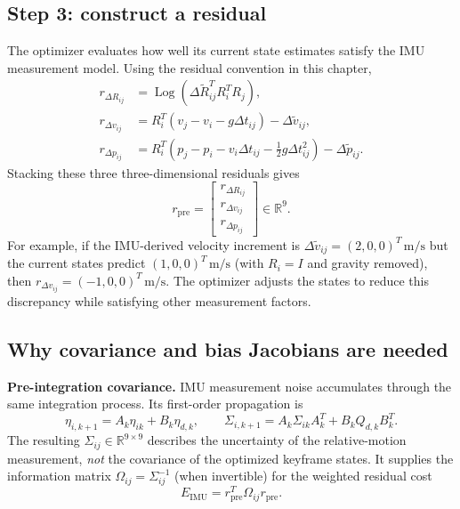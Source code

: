 \documentclass[11pt,a4paper]{article}
\newcommand{\Log}{\operatorname{Log}}
\newcommand{\R}{\mathbb{R}}
\begin{document}
\subsection{Step 3: construct a residual}
The optimizer evaluates how well its current state estimates satisfy
the IMU measurement model. Using the residual convention in this chapter,
\begin{subequations}\label{eq:concept_residuals}
\begin{align}
r_{\Delta R_{ij}}
&=\Log\!\left(\Delta\tilde R_{ij}^TR_i^TR_j\right),\\
r_{\Delta v_{ij}}
&=R_i^T(v_j-v_i-g\Delta t_{ij})-\Delta\tilde v_{ij},\\
r_{\Delta p_{ij}}
&=R_i^T\!\left(p_j-p_i-v_i\Delta t_{ij}
-\tfrac12g\Delta t_{ij}^2\right)-\Delta\tilde p_{ij}.
\end{align}
\end{subequations}
Stacking these three three-dimensional residuals gives
\begin{equation}
r_{\mathrm{pre}}=
\begin{bmatrix}r_{\Delta R_{ij}}\\r_{\Delta v_{ij}}\\r_{\Delta p_{ij}}\end{bmatrix}
\in\R^9.
\end{equation}
For example, if the IMU-derived velocity increment is
$\Delta\tilde v_{ij}=(2,0,0)^T\,\mathrm{m/s}$ but the current states
predict $(1,0,0)^T\,\mathrm{m/s}$ (with $R_i=I$ and gravity removed),
then $r_{\Delta v_{ij}}=(-1,0,0)^T\,\mathrm{m/s}$. The optimizer
adjusts the states to reduce this discrepancy while satisfying other
measurement factors.

\subsection{Why covariance and bias Jacobians are needed}
\textbf{Pre-integration covariance.} IMU measurement noise accumulates
through the same integration process. Its first-order propagation is
\begin{equation}
\eta_{i,k+1}=A_k\eta_{ik}+B_k\eta_{d,k},\qquad
\Sigma_{i,k+1}=A_k\Sigma_{ik}A_k^T+B_kQ_{d,k}B_k^T.
\end{equation}
The resulting $\Sigma_{ij}\in\R^{9\times9}$ describes the
uncertainty of the relative-motion measurement, \emph{not} the
covariance of the optimized keyframe states. It supplies the
information matrix $\Omega_{ij}=\Sigma_{ij}^{-1}$ (when invertible)
for the weighted residual cost
\begin{equation}
E_{\mathrm{IMU}}=r_{\mathrm{pre}}^T\Omega_{ij}r_{\mathrm{pre}}.
\end{equation}
\end{document}

